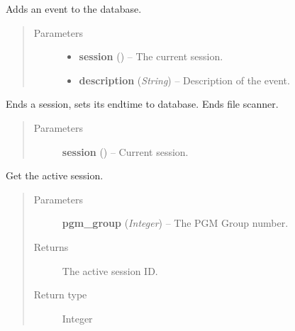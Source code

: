 \documentclass[letterpaper,10pt,english]{sphinxmanual}
\begin{document}
\begin{fulllineitems}
\label{controller:controller.session.add_event}
Adds an event to the database.
\begin{quote}\begin{description}
\item[{Parameters}] \leavevmode\begin{itemize}
\item {} 
\textbf{session} ({\hyperref[models:models.Session]{}}) -- The current session.

\item {} 
\textbf{description} (\emph{String}) -- Description of the event.

\end{itemize}

\end{description}\end{quote}

\end{fulllineitems}


\begin{fulllineitems}
\label{controller:controller.session.end_session}
Ends a session, sets its endtime to database.
Ends file scanner.
\begin{quote}\begin{description}
\item[{Parameters}] \leavevmode
\textbf{session} ({\hyperref[models:models.Session]{}}) -- Current session.

\end{description}\end{quote}

\end{fulllineitems}


\begin{fulllineitems}
\label{controller:controller.session.get_active_session}
Get the active session.
\begin{quote}\begin{description}
\item[{Parameters}] \leavevmode
\textbf{pgm\_group} (\emph{Integer}) -- The PGM Group number.

\item[{Returns}] \leavevmode
The active session ID.

\item[{Return type}] \leavevmode
Integer

\end{description}\end{quote}

\end{fulllineitems}
\end{document}
